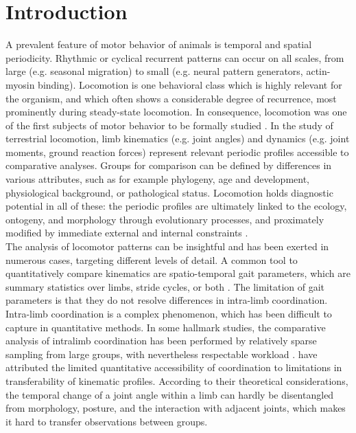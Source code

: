 \documentclass[10pt, a4paper]{article}
\begin{document}
\section{Introduction}
A prevalent feature of motor behavior of animals is temporal and spatial periodicity.
Rhythmic or cyclical recurrent patterns can occur on all scales, from large (e.g. seasonal migration) to small (e.g. neural pattern generators, actin-myosin binding). 
Locomotion is one behavioral class which is highly relevant for the organism, and which often shows a considerable degree of recurrence, most prominently during steady-state locomotion. %
In consequence, locomotion was one of the first subjects of motor behavior to be formally studied \citep{Marey1878,Muybridge1893,Braune1904,Bernstein1927a,Bernstein1927b}. 
In the study of terrestrial locomotion, limb kinematics (e.g. joint angles) and dynamics (e.g. joint moments, ground reaction forces) represent relevant periodic profiles accessible to comparative analyses. 
Groups for comparison can be defined by differences in various attributes, such as for example phylogeny, age and development, physiological background, or pathological status. 
Locomotion holds diagnostic potential in all of these: the periodic profiles are ultimately linked to the ecology, ontogeny, and morphology through evolutionary processes, and proximately modified by immediate external and internal constraints \citep[e.g.][]{Barrett2008,McGibbon2003,Mohling2014,Nyakatura2012,Nyakatura2019,Vanhooydonck2014,VandenHole2018}. 
\\The analysis of locomotor patterns can be insightful and has been exerted in numerous cases, targeting different levels of detail. 
A common tool to quantitatively compare kinematics are spatio-temporal gait parameters, which are summary statistics over limbs, stride cycles, or both \citep[see e.g.][]{Christiansen2002,Biancardi2012}. 
The limitation of gait parameters is that they do not resolve differences in intra-limb coordination. 
Intra-limb coordination is a complex phenomenon, which has been difficult to capture in quantitative methods. 
In some hallmark studies, the comparative analysis of intralimb coordination has been performed by relatively sparse sampling from large groups, with nevertheless respectable workload \citep{Stoessel2012,Fischer2002,Isler2005}. 
\citet{Gatesy2011} have attributed the limited quantitative accessibility of coordination to limitations in transferability of kinematic profiles. 
According to their theoretical considerations, the temporal change of a joint angle within a limb can hardly be disentangled from morphology, posture, and the interaction with adjacent joints, which makes it hard to transfer observations between groups. 
\end{document}
